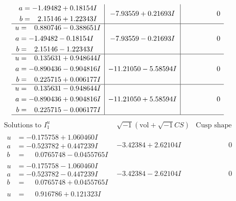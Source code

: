 \documentclass[1p]{elsarticle_modified}
\theoremstyle{definition}
\newcommand{\I}{\sqrt{-1}}
\begin{document}
$$\begin{array}{c|c|c}
\begin{aligned}
a &= -1.49482 + 0.18154 I \\
b &= \phantom{-}2.15146 + 1.22343 I\end{aligned}
 & -7.93559 + 0.21693 I & \phantom{-0.000000 } 0 \\ \hline\begin{aligned}
u &= \phantom{-}0.880746 - 0.388651 I \\
a &= -1.49482 - 0.18154 I \\
b &= \phantom{-}2.15146 - 1.22343 I\end{aligned}
 & -7.93559 - 0.21693 I & \phantom{-0.000000 } 0 \\ \hline\begin{aligned}
u &= \phantom{-}0.135631 + 0.948644 I \\
a &= -0.890436 - 0.904816 I \\
b &= \phantom{-}0.225715 + 0.006177 I\end{aligned}
 & -11.21050 - 5.58594 I & \phantom{-0.000000 } 0 \\ \hline\begin{aligned}
u &= \phantom{-}0.135631 - 0.948644 I \\
a &= -0.890436 + 0.904816 I \\
b &= \phantom{-}0.225715 - 0.006177 I\end{aligned}
 & -11.21050 + 5.58594 I & \phantom{-0.000000 } 0\\
 \hline 
 \end{array}$$\newpage$$\begin{array}{c|c|c}  
\text{Solutions to }I^u_{1}& \I (\text{vol} + \sqrt{-1}CS) & \text{Cusp shape}\\
 \hline 
\begin{aligned}
u &= -0.175758 + 1.060460 I \\
a &= -0.523782 + 0.447239 I \\
b &= \phantom{-}0.0765748 - 0.0455765 I\end{aligned}
 & -3.42384 + 2.62104 I & \phantom{-0.000000 } 0 \\ \hline\begin{aligned}
u &= -0.175758 - 1.060460 I \\
a &= -0.523782 - 0.447239 I \\
b &= \phantom{-}0.0765748 + 0.0455765 I\end{aligned}
 & -3.42384 - 2.62104 I & \phantom{-0.000000 } 0 \\ \hline\begin{aligned}
u &= \phantom{-}0.916786 + 0.121323 I \\

\end{aligned}
\end{array}$$
\end{document}
